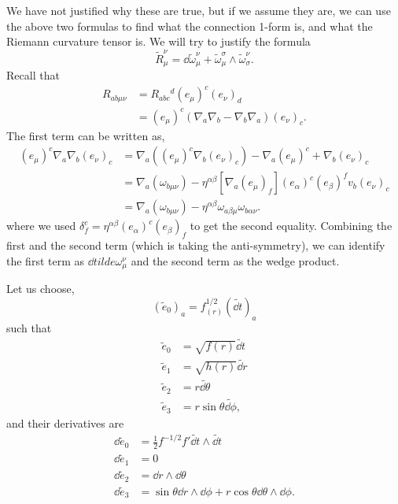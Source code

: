 \documentclass{article}
\numberwithin{equation}{section}
\begin{document}
\begin{idea}
    We have not justified why these are true, but if we assume they are, we can use the above two formulas to find what the connection 1-form is, and what the Riemann curvature tensor is. We will try to justify the formula 
    \begin{equation*}
        \tilde{R}_{\mu}^{\nu} = \dd{\tilde{\omega}_{\mu}^{\nu}} + \tilde{\omega}_{\mu}^{\sigma} \wedge \tilde{\omega}_{\sigma}^{\nu}.
    \end{equation*}
    Recall that 
    \begin{align*}
        R_{ab\mu\nu} &= R_{abc}{}^d (e_\mu)^c (e_{\nu})_d \\ 
        &=(e_{\mu})^{c} (\nabla_a\nabla_b - \nabla_b\nabla_a)(e_\nu)_c.
    \end{align*}
    The first term can be written as, 
    \begin{align*}
        (e_\mu)^c \nabla_a\nabla_b (e_\nu)_c &= \nabla_a \left((e_\mu)^c \nabla_b (e_\nu)_c\right) - \nabla_a (e_\mu)^c + \nabla_b(e_{\nu})_c \\ 
        &= \nabla_a(\omega_{b\mu\nu}) - \eta^{\alpha\beta}[\nabla_a (e_{\mu})_f](e_\alpha)^c(e_\beta)^f v_b(e_\nu)_c \\ 
        &= \nabla_{a}(\omega_{b\mu\nu}) - \eta^{\alpha\beta}\omega_{a\beta \mu}\omega_{b\alpha\nu}.
    \end{align*}
    where we used $\delta^c_f = \eta^{\alpha\beta}(e_\alpha)^c (e_\beta)_f$ to get the second equality. Combining the first and the second term (which is taking the anti-symmetry), we can identify the first term as $\dd{tilde{\omega}_{\mu}^{\nu}}$ and the second term as the wedge product.
\end{idea}
Let us choose,
$$(\tilde{e}_0)_a = f^{1/2}_{(r)}(\tilde{\dd{t}})_a$$
such that
\begin{align*}
    \tilde{e}_0 &= \sqrt{f(r)} \tilde{\dd{t}} \\
    \tilde{e}_1 &= \sqrt{h(r)}\tilde{\dd{r}} \\ 
    \tilde{e}_2 &= r \tilde{\dd{\theta}} \\ 
    \tilde{e}_3 &= r\sin\theta \tilde{\dd{\phi}},
\end{align*}
and their derivatives are 
\begin{align*}
    \dd{\tilde{e}_0} &= \frac{1}{2}f^{-1/2}f'\tilde{\dd{t}} \wedge \tilde{\dd{t}} \\
    \dd{\tilde{e}_1} &= 0 \\ 
    \dd{\tilde{e}_2} &= \dd{r}\wedge \dd{\theta} \\ 
    \dd{\tilde{e}_3} &= \sin\theta \dd{r}\wedge \dd{\phi} + r\cos\theta\dd{\theta}\wedge \dd{\phi}.
\end{align*}
\end{document}
